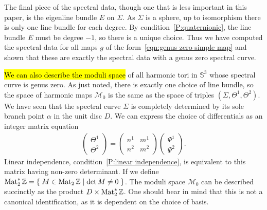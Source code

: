 \documentclass{article}
\begin{document}


The final piece of the spectral data, though one that is less important in this paper, is the eigenline bundle $E$ on $\Sigma$. As $\Sigma$ is a sphere, up to isomorphism there is only one line bundle for each degree. By condition~\ref{P:quaternionic}, the line bundle $E$ must be degree $-1$, so there is a unique choice. Thus we have computed the spectral data for all maps $g$ of the form~\eqref{eqn:genus zero simple map} and shown that these are exactly the spectral data with a genus zero spectral curve.


\hl{We can also describe the moduli space }of all harmonic tori in $\mathbb{S}^3$ whose spectral curve is genus zero. As just noted, there is exactly one choice of line bundle, so the space of harmonic maps $\mathcal{M}_0$ is the same as the space of triples $(\Sigma,\Theta^1,\Theta^2)$. We have seen that the spectral curve $\Sigma$ is completely determined by its sole branch point $\alpha$ in the unit disc $D$. 
We can express the choice of differentials as an integer matrix equation
\begin{align*}
\begin{pmatrix}
\Theta^1 \\ \Theta^2
\end{pmatrix}
=
\begin{pmatrix}
n^1 & m^1 \\
n^2 & m^2
\end{pmatrix}
\begin{pmatrix}
\Psi^1 \\ \Psi^2
\end{pmatrix}.
\end{align*}
Linear independence, condition~\ref{P:linear independence}, is equivalent to this matrix having non-zero determinant. If we define $\operatorname{Mat}_2^*\mathbb{Z} = \left\{\;  M \in \operatorname{Mat}_2\mathbb{Z}  \;\middle|\; \det M \neq 0 \;\right\}$. The moduli space $\mathcal{M}_0$ can be described succinctly as the product $D \times \operatorname{Mat}_2^*\mathbb{Z}$. 
One should bear in mind that this is not a canonical identification, as it is dependent on the choice of basis.
\end{document}
